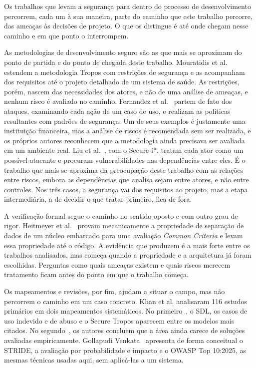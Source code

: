 \documentclass[conference]{IEEEtran}
\begin{document}
Os trabalhos que levam a segurança para dentro do processo de desenvolvimento percorrem, cada um à sua maneira, parte do caminho que este trabalho percorre, das ameaças às decisões de projeto. O que os distingue é até onde chegam nesse caminho e em que ponto o interrompem.

As metodologias de desenvolvimento seguro são as que mais se aproximam do ponto de partida e do ponto de chegada deste trabalho. Mouratidis et al.~\cite{mouratidis2005} estendem a metodologia Tropos com restrições de segurança e as acompanham dos requisitos até o projeto detalhado de um sistema de saúde. As restrições, porém, nascem das necessidades dos atores, e não de uma análise de ameaças, e nenhum risco é avaliado no caminho. Fernandez et al.~\cite{fernandez2007} partem de fato dos ataques, examinando cada ação de um caso de uso, e realizam as políticas resultantes com padrões de segurança. Um de seus exemplos é justamente uma instituição financeira, mas a análise de riscos é recomendada sem ser realizada, e os próprios autores reconhecem que a metodologia ainda precisava ser avaliada em um ambiente real. Liu et al.~\cite{liu2009}, com o Secure-i*, tratam cada ator como um possível atacante e procuram vulnerabilidades nas dependências entre eles. É o trabalho que mais se aproxima da preocupação deste trabalho com as relações entre riscos, embora as dependências que analisa sejam entre atores, e não entre controles. Nos três casos, a segurança vai dos requisitos ao projeto, mas a etapa intermediária, a de decidir o que tratar primeiro, fica de fora.

A verificação formal segue o caminho no sentido oposto e com outro grau de rigor. Heitmeyer et al.~\cite{heitmeyer2008} provam mecanicamente a propriedade de separação de dados de um núcleo embarcado para uma avaliação \textit{Common Criteria} e levam essa propriedade até o código. A evidência que produzem é a mais forte entre os trabalhos analisados, mas começa quando a propriedade e a arquitetura já foram escolhidas. Perguntas como quais ameaças existem e quais riscos merecem tratamento ficam antes do ponto em que o trabalho começa.

Os mapeamentos e revisões, por fim, ajudam a situar o campo, mas não percorrem o caminho em um caso concreto. Khan et al. analisaram 116 estudos primários em dois mapeamentos sistemáticos. No primeiro~\cite{khan2020}, o SDL, os casos de uso indevido e de abuso e o Secure Tropos aparecem entre os modelos mais citados. No segundo~\cite{khan2021}, os autores concluem que a área ainda carece de soluções avaliadas empiricamente. Gollapudi Venkata~\cite{gollapudi2025} apresenta de forma conceitual o STRIDE, a avaliação por probabilidade e impacto e o OWASP Top 10:2025, as mesmas técnicas usadas aqui, sem aplicá-las a um sistema.
\end{document}
